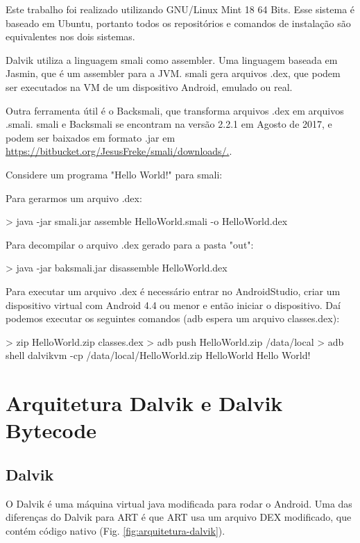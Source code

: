 \documentclass[12pt,a4paper,twoside]{report}
\begin{document}
Este trabalho foi realizado utilizando GNU/Linux Mint 18 64 Bits.
Esse sistema é baseado em Ubuntu, portanto todos os repositórios e comandos
de instalação são equivalentes nos dois sistemas.

Dalvik utiliza a linguagem smali como assembler. Uma linguagem baseada
em Jasmin, que é um assembler para a JVM. smali gera arquivos .dex, que
podem ser executados na VM de um dispositivo Android, emulado ou real.

Outra ferramenta útil é o Backsmali, que transforma arquivos .dex em
arquivos .smali. smali e Backsmali se encontram na versão 2.2.1 em Agosto de 2017,
e podem ser baixados em formato .jar em \url{https://bitbucket.org/JesusFreke/smali/downloads/.}.

Considere um programa "Hello World!" para smali:



Para gerarmos um arquivo .dex:
\begin{terminal}
> java -jar smali.jar assemble HelloWorld.smali -o HelloWorld.dex
\end{terminal}

Para decompilar o arquivo .dex gerado para a pasta "out":
\begin{terminal}
> java -jar baksmali.jar disassemble HelloWorld.dex
\end{terminal}

Para executar um arquivo .dex é necessário entrar no AndroidStudio,
criar um dispositivo virtual com Android 4.4 ou menor e então iniciar o dispositivo.
Daí podemos executar os seguintes comandos (adb espera um arquivo classes.dex):
\begin{terminal}
> zip HelloWorld.zip classes.dex
> adb push HelloWorld.zip /data/local
> adb shell dalvikvm -cp /data/local/HelloWorld.zip HelloWorld
Hello World!
\end{terminal}

\section{Arquitetura Dalvik e Dalvik Bytecode}

\subsection{Dalvik}
O Dalvik é uma máquina virtual java modificada para rodar o Android. Uma das diferenças do
Dalvik para ART é que ART usa um arquivo DEX modificado, que contém código nativo (Fig. \ref{fig:arquitetura-dalvik}).
\end{document}

